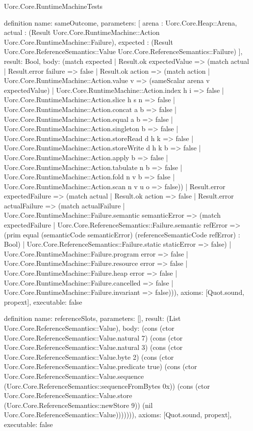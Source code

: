 \begin{lexlean}{Uorc.Core.RuntimeMachineTests}
\begin{semanticmodule}
definition{
  name: sameOutcome,
  parameters: [
    arena : Uorc.Core.Heap::Arena,
    actual : (Result Uorc.Core.RuntimeMachine::Action Uorc.Core.RuntimeMachine::Failure),
    expected : (Result Uorc.Core.ReferenceSemantics::Value Uorc.Core.ReferenceSemantics::Failure)
  ],
  result: Bool,
  body: (match expected
    | Result.ok expectedValue => (match actual
      | Result.error failure => false
      | Result.ok action => (match action
        | Uorc.Core.RuntimeMachine::Action.value v => (sameScalar arena v expectedValue)
        | Uorc.Core.RuntimeMachine::Action.index h i => false
        | Uorc.Core.RuntimeMachine::Action.slice h s n => false
        | Uorc.Core.RuntimeMachine::Action.concat a b => false
        | Uorc.Core.RuntimeMachine::Action.equal a b => false
        | Uorc.Core.RuntimeMachine::Action.singleton b => false
        | Uorc.Core.RuntimeMachine::Action.storeRead d h k => false
        | Uorc.Core.RuntimeMachine::Action.storeWrite d h k b => false
        | Uorc.Core.RuntimeMachine::Action.apply b => false
        | Uorc.Core.RuntimeMachine::Action.tabulate n b => false
        | Uorc.Core.RuntimeMachine::Action.fold n v b => false
        | Uorc.Core.RuntimeMachine::Action.scan n v u o => false))
    | Result.error expectedFailure => (match actual
      | Result.ok action => false
      | Result.error actualFailure => (match actualFailure
        | Uorc.Core.RuntimeMachine::Failure.semantic semanticError => (match expectedFailure
          | Uorc.Core.ReferenceSemantics::Failure.semantic refError => (prim equal (semanticCode semanticError) (referenceSemanticCode refError) : Bool)
          | Uorc.Core.ReferenceSemantics::Failure.static staticError => false)
        | Uorc.Core.RuntimeMachine::Failure.program error => false
        | Uorc.Core.RuntimeMachine::Failure.resource error => false
        | Uorc.Core.RuntimeMachine::Failure.heap error => false
        | Uorc.Core.RuntimeMachine::Failure.cancelled => false
        | Uorc.Core.RuntimeMachine::Failure.invariant => false))),
  axioms: [Quot.sound, propext],
  executable: false
}

definition{
  name: referenceSlots,
  parameters: [],
  result: (List Uorc.Core.ReferenceSemantics::Value),
  body: (cons (ctor Uorc.Core.ReferenceSemantics::Value.natural 7) (cons (ctor Uorc.Core.ReferenceSemantics::Value.natural 3) (cons (ctor Uorc.Core.ReferenceSemantics::Value.byte 2) (cons (ctor Uorc.Core.ReferenceSemantics::Value.predicate true) (cons (ctor Uorc.Core.ReferenceSemantics::Value.sequence (Uorc.Core.ReferenceSemantics::sequenceFromBytes 0x)) (cons (ctor Uorc.Core.ReferenceSemantics::Value.store (Uorc.Core.ReferenceSemantics::newStore 9)) (nil Uorc.Core.ReferenceSemantics::Value))))))),
  axioms: [Quot.sound, propext],
  executable: false
}


\end{semanticmodule}
\end{lexlean}
